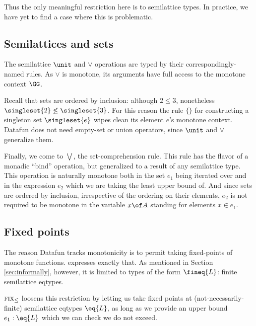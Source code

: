 Thus the only meaningful restriction here is to semilattice types. In practice,
we have yet to find a case where this is problematic.


\subsection{Semilattices and sets}
The semilattice $\unit$ and $\vee$ operations are typed by their
correspondingly-named rules. As $\vee$ is monotone, its arguments have full
access to the monotone context $\GG$.

Recall that sets are ordered by inclusion: although $2 \le 3$, nonetheless
$\singleset{2} \not\le \singleset{3}$. For this reason the rule $\{\}$ for
constructing a singleton set $\singleset{e}$ wipes clean its element $e$'s
monotone context. Datafun does not need empty-set or union operators, since
$\unit$ and $\vee$ generalize them.

Finally, we come to $\bigvee$, the set-comprehension rule. This rule has the
flavor of a monadic ``bind'' operation, but generalized to a result of any
semilattice type. This operation is naturally monotone both in the set $e_1$
being iterated over and in the expression $e_2$ which we are taking the least
upper bound of. And since sets are ordered by inclusion, irrespective of the
ordering on their elements, $e_2$ is not required to be monotone in the variable
$x \of A$ standing for elements $x \in e_1$.


\subsection{Fixed points}

The reason Datafun tracks monotonicity is to permit taking fixed-points of
monotone functions.  expresses exactly that. As mentioned in Section
\ref{sec:informally}, however, it is limited to types of the form $\fineq{L}$:
finite semilattice eqtypes.

$\textsc{fix}_\le$ loosens this restriction by letting us take fixed points at
(not-necessarily-finite) semilattice eqtypes $\eq{L}$, as long as we provide an
upper bound $e_1 : \eq{L}$ which we can check we do not exceed.
